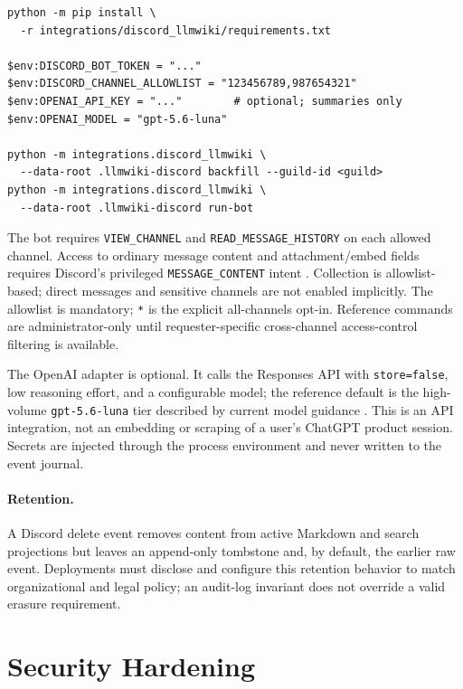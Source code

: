 \begin{verbatim}
python -m pip install \
  -r integrations/discord_llmwiki/requirements.txt

$env:DISCORD_BOT_TOKEN = "..."
$env:DISCORD_CHANNEL_ALLOWLIST = "123456789,987654321"
$env:OPENAI_API_KEY = "..."        # optional; summaries only
$env:OPENAI_MODEL = "gpt-5.6-luna"

python -m integrations.discord_llmwiki \
  --data-root .llmwiki-discord backfill --guild-id <guild>
python -m integrations.discord_llmwiki \
  --data-root .llmwiki-discord run-bot
\end{verbatim}

The bot requires \texttt{VIEW\_CHANNEL} and
\texttt{READ\_MESSAGE\_HISTORY} on each allowed channel. Access to ordinary
message content and attachment/embed fields requires Discord's privileged
\texttt{MESSAGE\_CONTENT} intent \citep{discord2026messages,discord2026gateway}.
Collection is allowlist-based; direct messages and sensitive channels are not
enabled implicitly. The allowlist is mandatory; \texttt{*} is the explicit
all-channels opt-in. Reference commands are administrator-only until
requester-specific cross-channel access-control filtering is available.

The OpenAI adapter is optional. It calls the Responses API with
\texttt{store=false}, low reasoning effort, and a configurable model; the
reference default is the high-volume \texttt{gpt-5.6-luna} tier described by
current model guidance \citep{openai2026modelguidance}. This is an API
integration, not an embedding or scraping of a user's ChatGPT product session.
Secrets are injected through the process environment and never written to the
event journal.

\paragraph{Retention.}
A Discord delete event removes content from active Markdown and search
projections but leaves an append-only tombstone and, by default, the earlier raw
event. Deployments must disclose and configure this retention behavior to match
organizational and legal policy; an audit-log invariant does not override a
valid erasure requirement.

\section{Security Hardening}
\label{sec:deploy:security}

